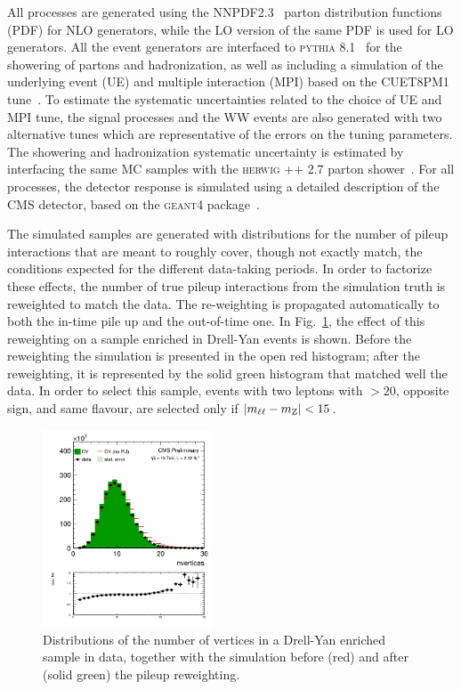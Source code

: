 All processes are generated using the NNPDF2.3~\cite{Ball:2013hta,Ball:2011uy} parton distribution functions (PDF) for NLO generators,
while the LO version of the same PDF is used for LO generators. All the event generators are interfaced 
to \textsc{pythia} 8.1~\cite{Sjostrand:2007gs} for the showering of
partons and hadronization, as well as including a simulation of the underlying event (UE) and multiple interaction (MPI)
based on the CUET8PM1 tune~\cite{Khachatryan:2015pea}. 
%
To estimate the systematic uncertainties related to the choice of UE and MPI tune, the signal processes and the WW
events are also generated with two alternative tunes which are representative of the errors on the tuning parameters.
The showering and hadronization systematic uncertainty is estimated by interfacing the same MC samples with the 
\textsc{herwig ++} 2.7 parton shower~\cite{Richardson:2013nfo,Bellm:2013hwb}.
%
For all processes, the detector response is simulated using a detailed
description of the CMS detector, based on the \textsc{geant4} package~\cite{Agostinelli:2002hh}. 

The simulated samples are generated with distributions for the number of pileup interactions that are meant to roughly cover,
though not exactly match, the conditions expected for the different data-taking periods. In order to factorize these effects, 
the number of true pileup interactions from the simulation truth is reweighted to match the data.
The re-weighting is propagated automatically to both the in-time pile up and the out-of-time one.
In Fig.~\ref{Fig:pu}, the effect of this reweighting on a sample enriched in Drell-Yan events is shown.
Before the reweighting the simulation is presented in the open red histogram; after the reweighting,
it is represented by the solid green histogram that matched well the data. In order to select this sample, 
events with two leptons with \pt$> 20$\GeV, opposite sign, and same flavour, are selected only if  $|m_{\ell\ell} - m_\mathrm{Z}| < 15$\GeV. 

\begin{figure}[htbp]
\centering
\includegraphics[width=0.45\textwidth]{images/13TeV/nvertices.png}
\caption{
    Distributions of the number of vertices in a Drell-Yan enriched sample in data,
    together with the simulation before (red) and after (solid green) the pileup reweighting. }
    \label{Fig:pu}
\end{figure}

